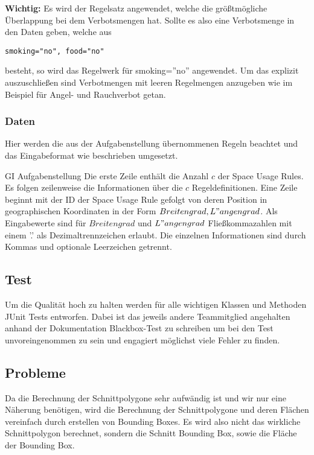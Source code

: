 \textbf{Wichtig:} Es wird der Regelsatz angewendet, welche die größtmögliche Überlappung bei dem Verbotsmengen hat.
Sollte es also eine Verbotsmenge in den Daten geben, welche aus \begin{lstlisting}[frame=single]
smoking="no", food="no"
\end{lstlisting}
besteht, so wird das Regelwerk für smoking=''no'' angewendet. Um das explizit auszuschließen sind Verbotmengen mit leeren Regelmengen anzugeben
wie im Beispiel für Angel- und Rauchverbot getan.

\subsubsection{Daten}
\label{sec:Eingabedaten_GI}
Hier werden die aus der Aufgabenstellung übernommenen Regeln beachtet und das Eingabeformat wie beschrieben umgesetzt.
\begin{aquote}{GI Aufgabenstellung}
Die erste Zeile enthält die Anzahl $c$ der Space Usage Rules. Es folgen zeilenweise die Informationen
über die $c$ Regeldefinitionen.
Eine Zeile beginnt mit der ID der Space Usage Rule gefolgt von deren Position in geographischen
Koordinaten in der Form $Breitengrad, L"angengrad$. Als Eingabewerte sind für $Breitengrad$ und
$L"angengrad$ Fließkommazahlen mit einem ’.’ als Dezimaltrennzeichen erlaubt. Die einzelnen Informationen
sind durch Kommas und optionale Leerzeichen getrennt.
\end{aquote}

\subsection{Test}
Um die Qualität hoch zu halten werden für alle wichtigen Klassen und Methoden JUnit Tests
entworfen. Dabei ist das jeweils andere Teammitglied angehalten anhand der Dokumentation Blackbox-Test zu
schreiben um bei den Test unvoreingenommen zu sein und engagiert möglichst viele Fehler zu finden.

\subsection{Probleme}
Da die Berechnung der Schnittpolygone sehr aufwändig ist und wir nur eine Näherung benötigen,
wird die Berechnung der Schnittpolygone und deren Flächen vereinfach durch erstellen von Bounding Boxes.
Es wird also nicht das wirkliche Schnittpolygon berechnet, sondern die Schnitt Bounding Box, sowie die Fläche der Bounding Box.
